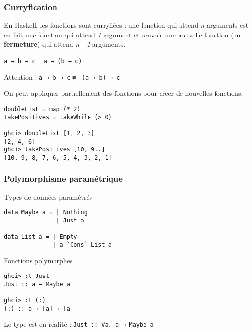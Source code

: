\documentclass[10pt]{beamer}
\begin{document}
\begin{frame}[fragile]
\frametitle{Curryfication}

En Haskell, les fonctions sont curryfiées : une fonction qui attend \emph{n}
arguments est en fait une fonction qui attend \emph{1} argument et renvoie une
nouvelle fonction (ou \textbf{fermeture}) qui attend \emph{n - 1} arguments.

\begin{theorem}
\verb|a → b → c| ≡ \verb|a → (b → c)|
\end{theorem}

\begin{block}
{Attention !}
\verb|a → b → c| ≢ \verb|(a → b) → c|
\end{block}

On peut appliquer partiellement des fonctions pour créer de nouvelles
fonctions.

\begin{verbatim}
doubleList = map (* 2)
takePositives = takeWhile (> 0)

ghci> doubleList [1, 2, 3]
[2, 4, 6]
ghci> takePositives [10, 9..]
[10, 9, 8, 7, 6, 5, 4, 3, 2, 1]
\end{verbatim}

\end{frame}



\begin{frame}[fragile]
\frametitle{Polymorphisme paramétrique}
\begin{block}
{Types de données paramétrés}
\begin{verbatim}
data Maybe a = | Nothing
               | Just a

data List a = | Empty
              | a `Cons` List a
\end{verbatim}
\end{block}
\begin{block}
{Fonctions polymorphes}
\begin{verbatim}
ghci> :t Just
Just :: a → Maybe a

ghci> :t (:)
(:) :: a → [a] → [a]
\end{verbatim}
\end{block}
Le type est en réalité : \verb|Just :: ∀a. a → Maybe a|
\end{frame}
\end{document}
